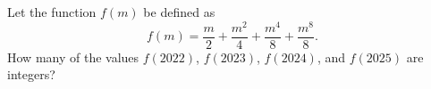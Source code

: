Let the function $f(m)$ be defined as \[f(m)=\dfrac{m}{2}+\dfrac{m^{2}}{4}+\dfrac{m^{4}}{8}+\dfrac{m^{8}}{8}.\]How many of the values $f(2022)$, $f(2023)$, $f(2024)$, and $f(2025)$ are integers?
